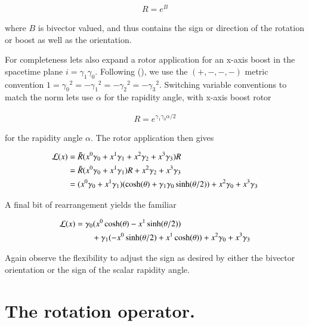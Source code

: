 \begin{align}\label{eqn:rotationGen:foo33}
R = e^{B}
\end{align}

where $B$ is bivector valued, and thus contains the sign or direction of the rotation or boost as well as the orientation.


For completeness lets also expand a rotor application for an x-axis boost in the spacetime plane $i = \gamma_1 \gamma_0$.  Following (\citep{doran2003gap}), we use the $(+,-,-,-)$ metric convention $1 = {\gamma_0}^2 = -{\gamma_1}^2 = -{\gamma_2}^2 = -{\gamma_3}^2$.  Switching variable conventions to match the norm lets use $\alpha$ for the rapidity angle, with x-axis boost rotor

\begin{align}\label{eqn:rotationGen:foo34}
R = e^{\gamma_1 \gamma_0 \alpha/2}
\end{align}

for the rapidity angle $\alpha$.  The rotor application then gives

\begin{align*}
\mathcal{L}(x) 
&= \tilde{R} (x^0 \gamma_0 + x^1 \gamma_1 + x^2 \gamma_2 + x^3 \gamma_3 ) R \\
&=
\tilde{R} (x^0 \gamma_0 + x^1 \gamma_1) R + x^2 \gamma_2 + x^3 \gamma_3 \\
&=
(x^0 \gamma_0 + x^1 \gamma_1) (\cosh(\theta) + \gamma_1 \gamma_0 \sinh(\theta/2)) + x^2 \gamma_0 + x^3 \gamma_3 \\
\end{align*}

A final bit of rearrangement yields the familiar 

\begin{equation}\label{eqn:rotationGen:foo35}
\begin{aligned}
\mathcal{L}(x)
&=
\gamma_0 (x^0 \cosh(\theta) - x^1 \sinh(\theta/2)) \\
&\qquad + \gamma_1 ( -x^0 \sinh(\theta/2) + x^1 \cosh(\theta))
+ x^2 \gamma_0 + x^3 \gamma_3 
\end{aligned}
\end{equation}

Again observe the flexibility to adjust the sign as desired by either the bivector orientation or the sign of the scalar rapidity angle.

\section{The rotation operator.}

